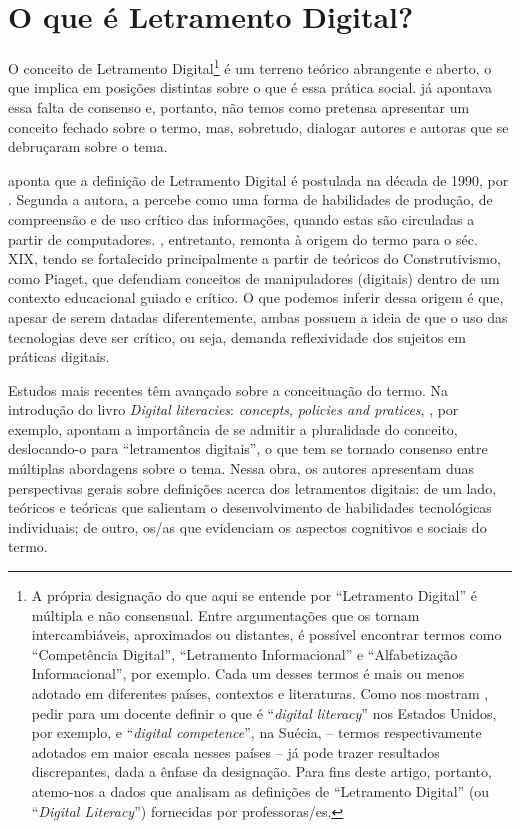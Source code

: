 \documentclass[portuguese]{textolivre}
\begin{document}
\section{O que é Letramento Digital?}

O conceito de Letramento Digital\footnote{A própria designação do que aqui se entende por “Letramento Digital” é múltipla e não consensual. Entre argumentações que os tornam intercambiáveis, aproximados ou distantes, é possível encontrar termos como “Competência Digital”, “Letramento Informacional” e “Alfabetização Informacional”, por exemplo. Cada um desses termos é mais ou menos adotado em diferentes países, contextos e literaturas. Como nos mostram \textcite{list_framework_2020}, pedir para um docente definir o que é “\textit{digital literacy}” nos Estados Unidos, por exemplo, e “\textit{digital competence}”, na Suécia, – termos respectivamente adotados em maior escala nesses países – já pode trazer resultados discrepantes, dada a ênfase da designação. Para fins deste artigo, portanto, atemo-nos a dados que analisam as definições de “Letramento Digital” (ou “\textit{Digital Literacy}”) fornecidas por professoras/es.} é um terreno teórico abrangente e aberto, o que implica em posições distintas sobre o que é essa prática social. \textcite{herring_internet_2004} já apontava essa falta de consenso e, portanto, não temos como pretensa apresentar um conceito fechado sobre o termo, mas, sobretudo, dialogar autores e autoras que se debruçaram sobre o tema.

\textcite{aillerie_teenagers_2019} aponta que a definição de Letramento Digital é postulada na década de 1990, por \textcite{glister_digital_1997}. Segunda a autora, \textcite{glister_digital_1997} a percebe como uma forma de habilidades de produção, de compreensão e de uso crítico das informações, quando estas são circuladas a partir de computadores. \textcite{herring_internet_2004}, entretanto, remonta à origem do termo para o séc. XIX, tendo se fortalecido principalmente a partir de teóricos do Construtivismo, como Piaget, que defendiam conceitos de manipuladores (digitais) dentro de um contexto educacional guiado e crítico. O que podemos inferir dessa origem é que, apesar de serem datadas diferentemente, ambas possuem a ideia de que o uso das tecnologias deve ser crítico, ou seja, demanda reflexividade dos sujeitos em práticas digitais.

Estudos mais recentes têm avançado sobre a conceituação do termo. Na introdução do livro \textit{Digital literacies}: \textit{concepts}, \textit{policies and pratices}, \textcite{lankshear_digital_2008}, por exemplo, apontam a importância de se admitir a pluralidade do conceito, deslocando-o para “letramentos digitais”, o que tem se tornado consenso entre múltiplas abordagens sobre o tema. Nessa obra, os autores apresentam duas perspectivas gerais sobre definições acerca dos letramentos digitais: de um lado, teóricos e teóricas que salientam o desenvolvimento de habilidades tecnológicas individuais; de outro, os/as que evidenciam os aspectos cognitivos e sociais do termo.
\end{document}
